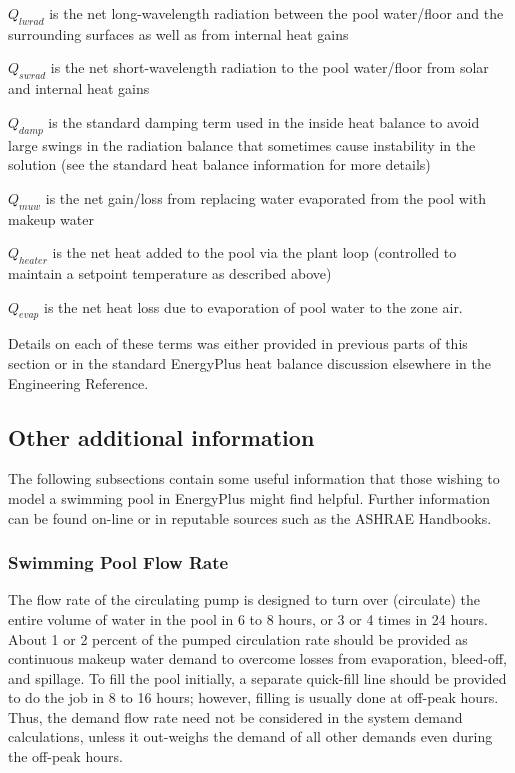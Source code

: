 \(Q_{lwrad}\) is the net long-wavelength radiation between the pool water/floor and the surrounding surfaces as well as from internal heat gains

\(Q_{swrad}\) is the net short-wavelength radiation to the pool water/floor from solar and internal heat gains

\(Q_{damp}\) is the standard damping term used in the inside heat balance to avoid large swings in the radiation balance that sometimes cause instability in the solution (see the standard heat balance information for more details)

\(Q_{muw}\) is the net gain/loss from replacing water evaporated from the pool with makeup water

\(Q_{heater}\) is the net heat added to the pool via the plant loop (controlled to maintain a setpoint temperature as described above)

\(Q_{evap}\) is the net heat loss due to evaporation of pool water to the zone air.


Details on each of these terms was either provided in previous parts of this section or in the standard EnergyPlus heat balance discussion elsewhere in the Engineering Reference.

\subsection{Other additional information}\label{other-additional-information}

The following subsections contain some useful information that those wishing to model a swimming pool in EnergyPlus might find helpful. Further information can be found on-line or in reputable sources such as the ASHRAE Handbooks.

\subsubsection{Swimming Pool Flow Rate}\label{swimming-pool-flow-rate}

The flow rate of the circulating pump is designed to turn over (circulate) the entire volume of water in the pool in 6 to 8 hours, or 3 or 4 times in 24 hours. About 1 or 2 percent of the pumped circulation rate should be provided as continuous makeup water demand to overcome losses from evaporation, bleed-off, and spillage. To fill the pool initially, a separate quick-fill line should be provided to do the job in 8 to 16 hours; however, filling is usually done at off-peak hours. Thus, the demand flow rate need not be considered in the system demand calculations, unless it out-weighs the demand of all other demands even during the off-peak hours.

